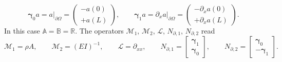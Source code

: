 \begin{equation}
	\bm\gamma_0 a = a\vert_{\partial\Omega} = \begin{pmatrix}
	-a(0) \\ +a(L)
	\end{pmatrix}, \qquad \bm\gamma_1 a = \partial_x a\vert_{\partial\Omega} = \begin{pmatrix}
	-\partial_x a(0) \\ +\partial_x a(L)
	\end{pmatrix}.
\end{equation}
In this case $\mathbb{A} = \mathbb{B} = \mathbb{R}$. The operators $\mathcal{M}_1, \, \mathcal{M}_2, \, \mathcal{L}, \, N_{\partial, 1}, \, N_{\partial, 2}$ read
\begin{equation}
\mathcal{M}_1 = \rho A, \qquad 
\mathcal{M}_2 = (EI)^{-1}, \qquad 
\mathcal{L} = \partial_{xx}, \qquad 
N_{\partial, 1} = \begin{bmatrix}
\bm\gamma_1 \\ \bm\gamma_0
\end{bmatrix}, \qquad 
N_{\partial, 2} = \begin{bmatrix}
\bm\gamma_0 \\ -\bm\gamma_1
\end{bmatrix}.
\end{equation}

